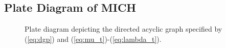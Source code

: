 \subsection{Plate Diagram of MICH}
\label{app:plate-diagram}

\begin{figure}
    \centering
    
    \caption{Plate diagram depicting the directed acyclic graph specified by (\ref{eq:dgp}) and (\ref{eq:mu_t})-(\ref{eq:lambda_t}).}
    \label{fig:plate-diagram}
\end{figure}
